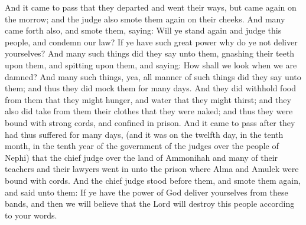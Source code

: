 And it came to pass that they departed and went their ways, but came again on the morrow; and the judge also smote them again on their cheeks. And many came forth also, and smote them, saying: Will ye stand again and judge this people, and condemn our law? If ye have such great power why do ye not deliver yourselves?
\bverse \iffalse And many such things did they say unto them, gnashing their teeth upon them, and spitting upon them, and saying: How shall we look when we are damned? \fi
And many such things did they say unto them, gnashing their teeth upon them, and spitting upon them, and saying: How shall we look when we are damned?
\bverse \iffalse And many such things, yea, all manner of such things did they say unto them; and thus they did mock them for many days. And they did withhold food from them that they might hunger, and water that they might thirst; and they also did take from them their clothes that they were naked; and thus they were bound with strong cords, and confined in prison. \fi
And many such things, yea, all manner of such things did they say unto them; and thus they did mock them for many days. And they did withhold food from them that they might hunger, and water that they might thirst; and they also did take from them their clothes that they were naked; and thus they were bound with strong cords, and confined in prison.
\bverse \iffalse And it came to pass after they had thus suffered for many days, (and it was on the twelfth day, in the tenth month, in the tenth year of the reign of the judges over the people of Nephi) that the chief judge over the land of Ammonihah and many of their teachers and their lawyers went in unto the prison where Alma and Amulek were bound with cords. \fi
And it came to pass after they had thus suffered for many days, (and it was on the twelfth day, in the tenth month, in the tenth year of the government of the judges over the people of Nephi) that the chief judge over the land of Ammonihah and many of their teachers and their lawyers went in unto the prison where Alma and Amulek were bound with cords.
\bverse \iffalse And the chief judge stood before them, and smote them again, and said unto them: If ye have the power of God deliver yourselves from these bands, and then we will believe that the Lord will destroy this people according to your words. \fi
And the chief judge stood before them, and smote them again, and said unto them: If ye have the power of God deliver yourselves from these bands, and then we will believe that the Lord will destroy this people according to your words.
